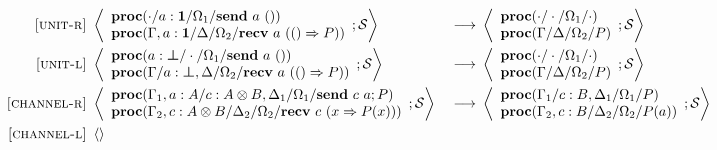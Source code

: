 \documentclass[12pt, openany]{memoir}
\newcommand*{\send}[2]{\textbf{send}\ #1\ #2}
\newcommand*{\recv}[2]{\textbf{recv}\ #1\ #2}
\newcommand*{\procObj}[4]{\textbf{proc}(#1/#2/#3/#4)}
\newcommand*{\cancelSet}[0]{\mathcal{S}}
\begin{document}
\begin{figure}[H]
  \begin{alignat}{4}
    \label{unit-reduction-r} \textsc{[unit-r]} & ~ 
    \Braket{
      \begin{array}{l}
        \procObj{\cdot}{a : \textbf{1}}{\Omega_1}{\send{a}{()}} \\
        \procObj{\Gamma, a : \textbf{1}}{\Delta}{\Omega_2}{\recv{a}{(() \Rightarrow P)}}
      \end{array}
      ; \cancelSet
    } & ~ \longrightarrow & ~ 
    \Braket{
      \begin{array}{l}
        \procObj{\cdot}{\cdot}{\Omega_1}{\cdot} \\
        \procObj{\Gamma}{\Delta}{\Omega_2}{P}
      \end{array}
      ; \cancelSet
    } \tag*{} \\
    \label{unit-reduction-l} \textsc{[unit-l]} & ~ 
    \Braket{
      \begin{array}{l}
        \procObj{a : \boldsymbol{\bot}}{\cdot}{\Omega_1}{\send{a}{()}} \\
        \procObj{\Gamma}{a : \boldsymbol{\bot}, \Delta}{\Omega_2}{\recv{a}{(() \Rightarrow P)}}
      \end{array}
      ; \cancelSet
    } & ~ \longrightarrow & ~ 
    \Braket{
      \begin{array}{l}
        \procObj{\cdot}{\cdot}{\Omega_1}{\cdot} \\
        \procObj{\Gamma}{\Delta}{\Omega_2}{P}
      \end{array}
      ; \cancelSet
    } \tag*{} \\
    \label{channel-reduction-r} \textsc{[channel-r]} & ~ 
    \Braket{
      \begin{array}{l}
        \procObj{\Gamma_1, a : A}{c : A\otimes B, \Delta_1}{\Omega_1}{\send{c}{a}; P} \\
        \procObj{\Gamma_2, c : A \otimes B}{\Delta_2}{\Omega_2}{\recv{c}{(x \Rightarrow P(x))}}
      \end{array}
      ; \cancelSet
    } & ~ \longrightarrow & ~ 
    \Braket{
      \begin{array}{l}
        \procObj{\Gamma_1}{c : B, \Delta_1}{\Omega_1}{P} \\
        \procObj{\Gamma_2, c : B}{\Delta_2}{\Omega_2}{P(a)}
      \end{array}
      ; \cancelSet 
    } \tag*{} \\
    \label{channel-reduction-l} \textsc{[channel-l]} & ~ 
      \Braket{
}
\end{alignat}
\end{figure}
\end{document}
